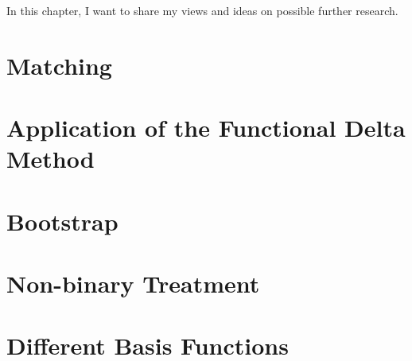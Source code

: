 In this chapter, I want to share my views and ideas on possible further research.
\section{Matching}
  
\section{Application of the Functional Delta Method}
  
\section{Bootstrap} 
  
\section{Non-binary Treatment}
  
\section{Different Basis Functions}
  
